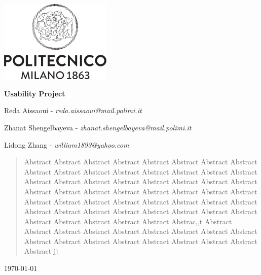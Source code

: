 \begin{titlepage}
\centering
\includegraphics[width=0.40\textwidth]{Design/resources/other/logo.png}\par
\vspace{1.5cm}
{\LARGE \textbf{Usability Project} \par}
\vspace{0.2cm}
{\large {}\par}
\vspace{1.0cm}
{\large Reda Aissaoui - \textit{reda.aissaoui@mail.polimi.it} \par}
{\large Zhanat Shengelbayeva - \textit{zhanat.shengelbayeva@mail.polimi.it} \par}
{\large Lidong Zhang  - \textit{william1893@yahoo.com} \par}
\vspace{2cm}
\begin{abstract} Abstract Abstract Abstract Abstract Abstract Abstract Abstract Abstract Abstract
  Abstract Abstract Abstract Abstract Abstract Abstract Abstract Abstract Abstract
  Abstract Abstract Abstract Abstract Abstract Abstract Abstract Abstract Abstract
  Abstract Abstract Abstract Abstract Abstract Abstract Abstract Abstract Abstract
  Abstract Abstract Abstract Abstract Abstract Abstract Abstract Abstract Abstract
  Abstract Abstract Abstract Abstract Abstract Abstract Abstract Abstract Abstrac,,t
  Abstract Abstract Abstract Abstract Abstract Abstract Abstract Abstract Abstract
  Abstract Abstract Abstract Abstract Abstract Abstract Abstract Abstract Abstract jj
\end{abstract}
\vfill
{\large \today \par}
\end{titlepage}
